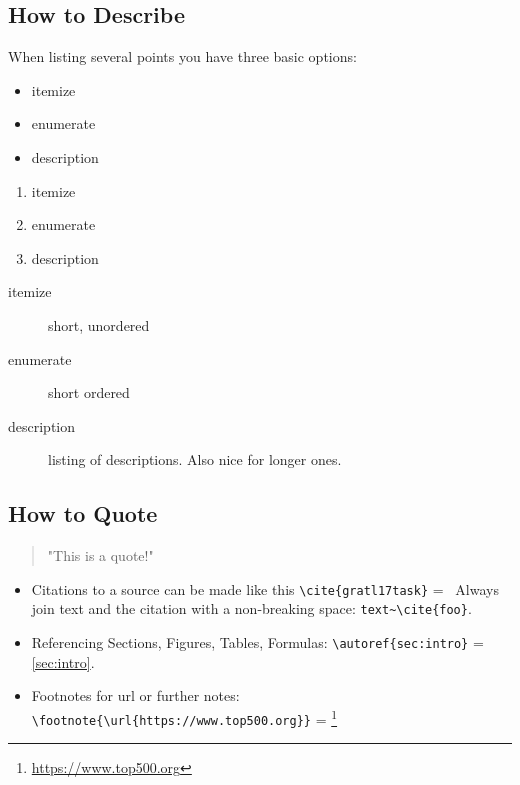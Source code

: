 \documentclass[11pt,
               a4paper,
               bibtotoc,
               idxtotoc,
               headsepline,
               footsepline,
               footexclude,
               BCOR12mm,
               DIV13,
               openany,   %
               ]
               {scrbook}
\begin{document}
\subsection{How to Describe}
\setlength{\columnsep}{30 pt}
When listing several points you have three basic options:
\begin{multicols}{3}
    \begin{itemize}
        \item itemize
        \item enumerate
        \item description
    \end{itemize}

    \vfill\null
    \columnbreak

    \begin{enumerate}
        \item itemize
        \item enumerate
        \item description
    \end{enumerate}

    \vfill\null
    \columnbreak

    \begin{description}
        \item[itemize] short, unordered
        \item[enumerate] short ordered
        \item[description] listing of descriptions. Also nice for longer ones.
    \end{description}

\end{multicols}


\subsection{How to Quote}

\begin{quote}
    "This is a quote!"
\end{quote}

\begin{itemize}
    \item Citations to a source can be made like this \verb|\cite{gratl17task}| =~\cite{gratl17task}
    \subitem Always join text and the citation with a non-breaking space: \verb|text~\cite{foo}|.
    \item Referencing Sections, Figures, Tables, Formulas: \verb|\autoref{sec:intro}| = \autoref{sec:intro}.
    \item Footnotes for url or further notes: \verb|\footnote{\url{https://www.top500.org}}| = \footnote{\url{https://www.top500.org}}
\end{itemize}
\end{document}

